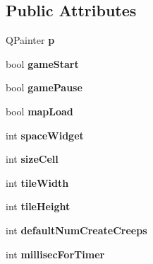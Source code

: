 \subsection*{Public Attributes}
\begin{DoxyCompactItemize}
\item 
\hypertarget{class_widget_a0a2086b66fdb05ec8686162a67339928}{}Q\+Painter {\bfseries p}\label{class_widget_a0a2086b66fdb05ec8686162a67339928}

\item 
\hypertarget{class_widget_affd9bbf8129a7292143ac6e8d8ec978d}{}bool {\bfseries game\+Start}\label{class_widget_affd9bbf8129a7292143ac6e8d8ec978d}

\item 
\hypertarget{class_widget_a44b1343eeea68e8f8ae8b18ec41546cb}{}bool {\bfseries game\+Pause}\label{class_widget_a44b1343eeea68e8f8ae8b18ec41546cb}

\item 
\hypertarget{class_widget_aba73fa49b2dfecf4374165e50a9a2ec5}{}bool {\bfseries map\+Load}\label{class_widget_aba73fa49b2dfecf4374165e50a9a2ec5}

\item 
\hypertarget{class_widget_ad39631c7480d8d2fd7916798750a90e4}{}int {\bfseries space\+Widget}\label{class_widget_ad39631c7480d8d2fd7916798750a90e4}

\item 
\hypertarget{class_widget_af765fe9bec36565573701a3c47df7dfd}{}int {\bfseries size\+Cell}\label{class_widget_af765fe9bec36565573701a3c47df7dfd}

\item 
\hypertarget{class_widget_a22f8d35ffc84cbc237383e0a9525ac35}{}int {\bfseries tile\+Width}\label{class_widget_a22f8d35ffc84cbc237383e0a9525ac35}

\item 
\hypertarget{class_widget_a4bac027a3d3691ffbcfbdfe358b89e30}{}int {\bfseries tile\+Height}\label{class_widget_a4bac027a3d3691ffbcfbdfe358b89e30}

\item 
\hypertarget{class_widget_ac5b7b72ed148db988e2f812e0031dabd}{}int {\bfseries default\+Num\+Create\+Creeps}\label{class_widget_ac5b7b72ed148db988e2f812e0031dabd}

\item 
\hypertarget{class_widget_a38c26ae9273d40414b3a4f8de9bbaf7f}{}int {\bfseries millisec\+For\+Timer}\label{class_widget_a38c26ae9273d40414b3a4f8de9bbaf7f}


\end{DoxyCompactItemize}
